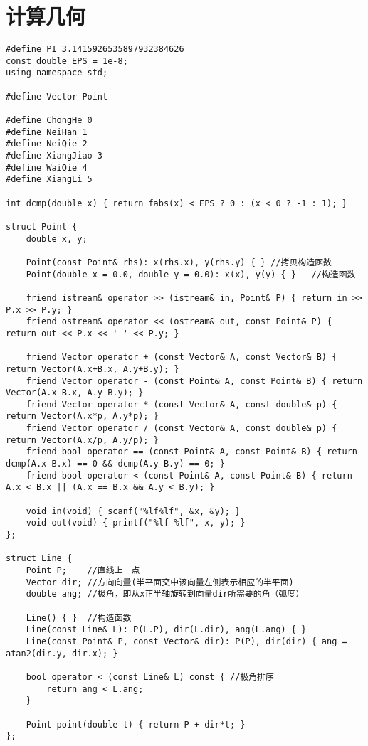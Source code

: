 \documentclass[twocolumn,a4]{article}
\begin{document}
\section{计算几何}
\begin{lstlisting}
#define PI 3.1415926535897932384626
const double EPS = 1e-8;
using namespace std;
 
#define Vector Point
 
#define ChongHe 0
#define NeiHan 1
#define NeiQie 2
#define XiangJiao 3
#define WaiQie 4
#define XiangLi 5
 
int dcmp(double x) { return fabs(x) < EPS ? 0 : (x < 0 ? -1 : 1); }
 
struct Point {
    double x, y;
 
    Point(const Point& rhs): x(rhs.x), y(rhs.y) { } //拷贝构造函数
    Point(double x = 0.0, double y = 0.0): x(x), y(y) { }   //构造函数
 
    friend istream& operator >> (istream& in, Point& P) { return in >> P.x >> P.y; }
    friend ostream& operator << (ostream& out, const Point& P) { return out << P.x << ' ' << P.y; }
 
    friend Vector operator + (const Vector& A, const Vector& B) { return Vector(A.x+B.x, A.y+B.y); }
    friend Vector operator - (const Point& A, const Point& B) { return Vector(A.x-B.x, A.y-B.y); }
    friend Vector operator * (const Vector& A, const double& p) { return Vector(A.x*p, A.y*p); }
    friend Vector operator / (const Vector& A, const double& p) { return Vector(A.x/p, A.y/p); }
    friend bool operator == (const Point& A, const Point& B) { return dcmp(A.x-B.x) == 0 && dcmp(A.y-B.y) == 0; }
    friend bool operator < (const Point& A, const Point& B) { return A.x < B.x || (A.x == B.x && A.y < B.y); }
 
    void in(void) { scanf("%lf%lf", &x, &y); }
    void out(void) { printf("%lf %lf", x, y); }
};
 
struct Line {
    Point P;    //直线上一点
    Vector dir; //方向向量(半平面交中该向量左侧表示相应的半平面)
    double ang; //极角，即从x正半轴旋转到向量dir所需要的角（弧度）
 
    Line() { }  //构造函数
    Line(const Line& L): P(L.P), dir(L.dir), ang(L.ang) { }
    Line(const Point& P, const Vector& dir): P(P), dir(dir) { ang = atan2(dir.y, dir.x); }
 
    bool operator < (const Line& L) const { //极角排序
        return ang < L.ang;
    }
 
    Point point(double t) { return P + dir*t; }
};
 

\end{lstlisting}
\end{document}
